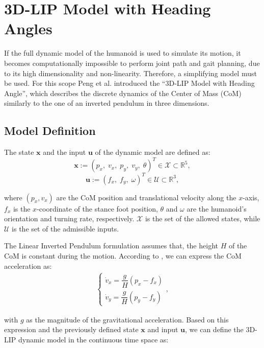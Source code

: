 \section{3D-LIP Model with Heading Angles}\label{sec:lip}
If the full dynamic model of the humanoid is used to simulate its motion, it becomes computationally impossible to perform joint path and gait planning, due to its high dimensionality and non-linearity. Therefore, a simplifying model must be used. For this scope Peng et al. introduced the ``3D-LIP Model with Heading Angle'', which describes the discrete dynamics of the Center of Mass (CoM) similarly to the one of an inverted pendulum in three dimensions.

\subsection{Model Definition}
The state $\mathbf{x}$ and the input $\mathbf{u}$ of the dynamic model are defined as:
$$ \mathbf{x} := \left( p_x,\; v_x,\; p_y,\; v_y,\; \theta \right)^T \in \mathcal{X} \subset \mathbb{R}^5 , $$
$$ \mathbf{u} := \left( f_x,\; f_y,\; \omega \right)^T \in \mathcal{U} \subset \mathbb{R}^3 , $$

where $(p_x, v_x)$ are the CoM position and translational velocity along the $x$-axis, $f_x$ is the $x$-coordinate of the stance foot position, $\theta$ and $\omega$ are the humanoid's orientation and turning rate, respectively. $\mathcal{X}$ is the set of the allowed states, while $\mathcal{U}$ is the set of the admissible inputs.

The Linear Inverted Pendulum formulation assumes that, the height $H$ of the CoM is constant during the motion.
According to \cite{peng_main_paper}, we can express the CoM acceleration as:
\begin{align}
    \begin{cases}
        \dot{v}_{x} = \dfrac{g}{H}(p_{x} - f_{x})
        \\[1ex]
        \dot{v}_{y} = \dfrac{g}{H}(p_{y} - f_{y})
    \end{cases},
\end{align}

with $g$ as the magnitude of the gravitational acceleration.
Based on this expression and the previously defined state $\mathbf{x}$ and input $\mathbf{u}$, we can define the 3D-LIP dynamic model in the continuous time space as:

